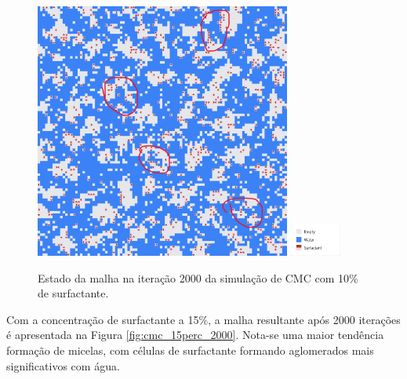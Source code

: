 \documentclass[12pt,oneside]{report}
\begin{document}
\begin{figure}[H]
    \centering
    \includegraphics[width=0.75\textwidth]{img/cmc_10perc_1000.png}
    \hspace{0.05\textwidth}
    \includegraphics[width=0.15\textwidth]{img/legend_cmc.png}
    \caption{\small Estado da malha na iteração 2000 da simulação de CMC com 10\% de surfactante.}
    \label{fig:cmc_10perc_1000}
\end{figure}

Com a concentração de surfactante a 15\%, a malha resultante após 2000 iterações é apresentada na Figura \ref{fig:cmc_15perc_2000}. Nota-se uma maior tendência formação de micelas, com células de surfactante formando aglomerados mais significativos com água.
\end{document}
